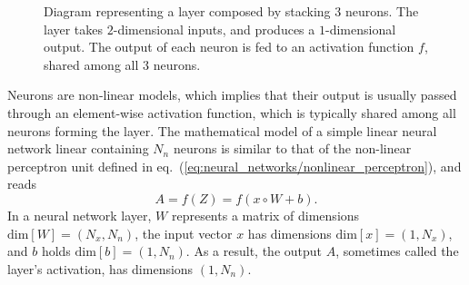 \begin{figure}[H]
	\caption{
        Diagram representing a layer composed by stacking $3$ neurons. The layer takes
        $2$-dimensional inputs, and produces a $1$-dimensional output. The output of each neuron is
        fed to an activation function $f$, shared among all $3$ neurons.
    }\label{fig:neural_networks/layer}
	\centering
\end{figure}

Neurons are non-linear models, which implies that their output is usually passed through an
element-wise activation function, which is typically shared among all neurons forming the layer. The
mathematical model of a simple linear neural network linear containing $N_n$ neurons is similar to
that of the non-linear perceptron unit defined in
eq.~(\ref{eq:neural_networks/nonlinear_perceptron}), and reads
\begin{equation}
    A = f(Z) = f(x \circ W + b).
    \label{eq:neural_networks/layer}
\end{equation}
In a neural network layer, $W$ represents a matrix of dimensions $\text{dim}[W] = (N_x, N_n)$, the
input vector $x$ has dimensions $\text{dim}[x] = (1, N_x)$, and $b$ holds $\text{dim}[b] = (1,
N_n)$. As a result, the output $A$, sometimes called the layer's activation, has dimensions $(1,
N_n)$.

